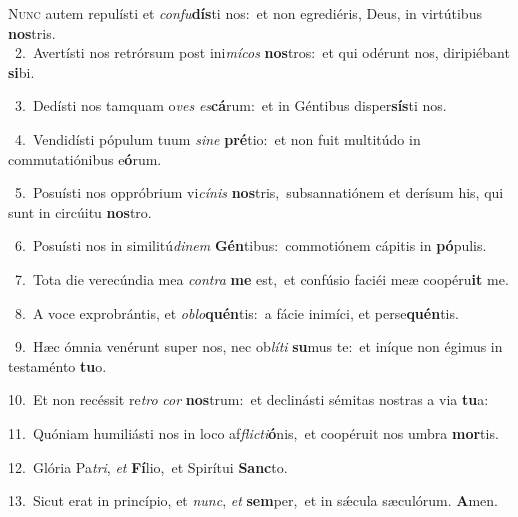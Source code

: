 \lettrine{\initial\textcolor{\initialcolor}{N}}{unc} autem repulísti et \textit{con}\-\textit{fu}\textbf{dís}ti nos:~\star et non egrediéris, Deus, in virtútibus \textbf{nos}\-tris.\\
{\numbfont\textcolor{\numbcolor}{~2.}}~Avertísti nos retrórsum post ini\-\textit{mí}\-\textit{cos} \textbf{nos}\-tros:~\star et qui odérunt nos, diripiébant \textbf{si}\-bi.\par
{\numbfont\textcolor{\numbcolor}{~3.}}~Dedísti nos tamquam o\textit{ves} \textit{es}\-\textbf{cá}rum:~\star et in Géntibus disper\-\textbf{sís}\-ti nos.\par
{\numbfont\textcolor{\numbcolor}{~4.}}~Vendidísti pópulum tuum \textit{si}\-\textit{ne} \textbf{pré}\-tio:~\star et non fuit multitúdo in commutatiónibus e\-\textbf{ó}\-rum.\par
{\numbfont\textcolor{\numbcolor}{~5.}}~Posuísti nos oppróbrium vi\-\textit{cí}\-\textit{nis} \textbf{nos}\-tris,~\star subsannatiónem et derísum his, qui sunt in circúitu \textbf{nos}\-tro.\par
{\numbfont\textcolor{\numbcolor}{~6.}}~Posuísti nos in similitú\-\textit{di}\-\textit{nem} \textbf{Gén}\-tibus:~\star commotiónem cápitis in \textbf{pó}\-pulis.\par
{\numbfont\textcolor{\numbcolor}{~7.}}~Tota die verecúndia mea \textit{con}\-\textit{tra} \textbf{me} est,~\star et confúsio faciéi meæ coopéru\textbf{it} me.\par
{\numbfont\textcolor{\numbcolor}{~8.}}~A voce exprobrántis, et \textit{ob}\-\textit{lo}\textbf{quén}tis:~\star a fácie inimíci, et perse\-\textbf{quén}\-tis.\par
{\numbfont\textcolor{\numbcolor}{~9.}}~Hæc ómnia venérunt super nos, nec ob\-\textit{lí}\-\textit{ti} \textbf{su}\-mus te:~\star et iníque non égimus in testaménto \textbf{tu}\-o.\par
{\numbfont\textcolor{\numbcolor}{10.}}~Et non recéssit re\textit{tro} \textit{cor} \textbf{nos}\-trum:~\star et declinásti sémitas nostras a via \textbf{tu}\-a:\par
{\numbfont\textcolor{\numbcolor}{11.}}~Quóniam humiliásti nos in loco af\-\textit{flic}\-\textit{ti}\textbf{ó}nis,~\star et coopéruit nos umbra \textbf{mor}\-tis.\par
{\numbfont\textcolor{\numbcolor}{12.}}~Glória Pa\-\textit{tri}\-, \textit{et} \textbf{Fí}\-lio,~\star et Spirítui \textbf{Sanc}\-to.\par
{\numbfont\textcolor{\numbcolor}{13.}}~Sicut erat in princípio, et \textit{nunc}\-, \textit{et} \textbf{sem}\-per,~\star et in sǽcula sæculórum. \textbf{A}\-men.\par

